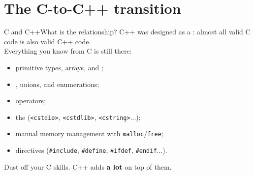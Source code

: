 
\section{The C-to-C++ transition}
\graphicspath{{figs/section1/}}

\begin{frame}{C and C++}{What is the relationship?}
	\justifying
	C++ was designed as a : almost all valid C code is also valid C++ code.\\
	\bigskip
	Everything you know from C is still there:
	\begin{itemize}
		\item primitive types, arrays, and ;
		\item {}, unions, and enumerations;
		\item operators;
		\item the  (\texttt{<cstdio>}, \texttt{<cstdlib>}, \texttt{<cstring>}...);
		\item manual memory management with \texttt{malloc}/\texttt{free};
		\item {} directives (\texttt{\#include}, \texttt{\#define}, \texttt{\#ifdef}, \texttt{\#endif}...).
	\end{itemize}
	\begin{block}{}
		\centering
		Dust off your C skills. C++ adds \textbf{a lot} on top of them.
	\end{block}
\end{frame}

